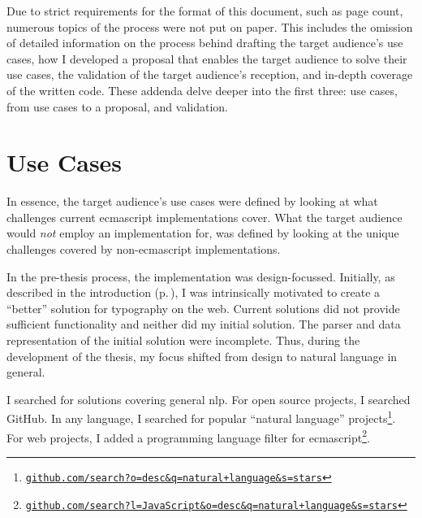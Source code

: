 
\begingroup
\let\clearpage\relax
\let\cleardoublepage\relax
\let\cleardoublepage\relax

\manualmark
{}

\noindent Due to strict requirements for the format of this document,
  such as page count, numerous topics of the process were not put on paper.
This includes the omission of detailed information on the process behind
  drafting the target audience's use cases, how I developed a proposal that
  enables the target audience to solve their use cases, the validation of the
  target audience's reception, and in-depth coverage of the written code.
These addenda delve deeper into the first three: use cases, from use cases
  to a proposal, and validation.

\chapter*{Use Cases}\label{addendum-use-cases}

In essence, the target audience's use cases were defined by looking at what
  challenges current \gls{ecmascript} implementations cover.
What the target audience would \emph{not} employ an implementation for, was
  defined by looking at the unique challenges covered by non-\gls{ecmascript}
  implementations.

In the pre-thesis process, the implementation was design-focussed.
Initially, as described in the introduction (p.\,\pageref{introduction}), I
  was intrinsically motivated to create a ``better'' solution for typography
  on the web.
Current solutions did not provide sufficient functionality and neither did my
  initial solution.
The parser and data representation of the initial solution were incomplete.
Thus, during the development of the thesis, my focus shifted from design to
  natural language in general.

I searched for solutions covering general \gls{nlp}.
For open source projects, I searched GitHub.
In any language, I searched for popular ``natural language''
  projects\footnote{
    \href{https://github.com/search?o=desc&q=natural+language&s=stars}{\nolinkurl{github.com/search?o=desc&q=natural+language&s=stars}}
  }.
For web projects, I added a programming language filter for
  \gls{ecmascript}\footnote{
    \href{https://github.com/search?l=JavaScript&o=desc&q=natural+language&s=stars}{\nolinkurl{github.com/search?l=JavaScript&o=desc&q=natural+language&s=stars}}
  }.

